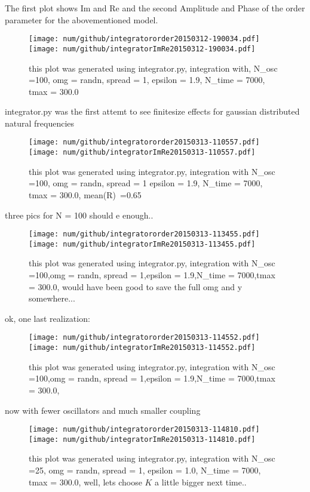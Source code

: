 The first plot shows Im and Re and the second Amplitude and Phase of the order parameter for the abovementioned model.\\
\begin{figure}[h!]\centering\texttt{[image: num/github/integratororder20150312-190034.pdf]}\texttt{[image: num/github/integratorImRe20150312-190034.pdf]}\caption{this plot was generated using integrator.py,
 integration with,  N\_osc =100, omg = randn, spread = 1, epsilon = 1.9, N\_time = 7000, tmax = 300.0}\end{figure}
integrator.py was the first attemt to see finitesize effects for gaussian distributed natural frequencies\\

\begin{figure}[h!]\centering\texttt{[image: num/github/integratororder20150313-110557.pdf]}\texttt{[image: num/github/integratorImRe20150313-110557.pdf]}\caption{this plot was generated using integrator.py, integration with N\_osc =100,  omg = randn, spread = 1
epsilon = 1.9, N\_time = 7000, tmax = 300.0, mean(R)~=0.65
}\end{figure}
three pics for N = 100 should e enough..
\begin{figure}[h!]\centering\texttt{[image: num/github/integratororder20150313-113455.pdf]}\texttt{[image: num/github/integratorImRe20150313-113455.pdf]}\caption{this plot was generated using integrator.py, integration with N\_osc =100,omg = randn, spread = 1,epsilon = 1.9,N\_time = 7000,tmax = 300.0, would have been good to save the full omg and y somewhere...
}\end{figure}
ok, one last realization:
\begin{figure}[h!]\centering\texttt{[image: num/github/integratororder20150313-114552.pdf]}\texttt{[image: num/github/integratorImRe20150313-114552.pdf]}\caption{this plot was generated using integrator.py, integration with N\_osc =100,omg = randn, spread = 1,epsilon = 1.9,N\_time = 7000,tmax = 300.0, }\end{figure}
now with fewer oscillators and much smaller coupling
\begin{figure}[h!]\centering\texttt{[image: num/github/integratororder20150313-114810.pdf]}\texttt{[image: num/github/integratorImRe20150313-114810.pdf]}\caption{this plot was generated using integrator.py, integration with N\_osc =25, omg = randn, spread = 1, epsilon = 1.0, N\_time = 7000, tmax = 300.0, well, lets choose $K$ a little bigger next time..}\end{figure}
